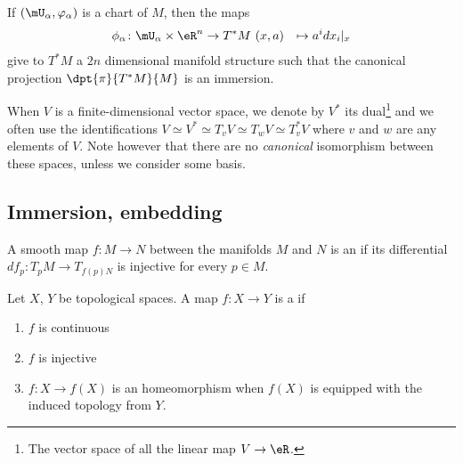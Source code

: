 If $(\mU_{\alpha},\varphi_{\alpha})$ is a chart of $M$, then the maps
		\begin{equation}
		\begin{aligned}
			\phi_{\alpha} \colon \mU_{\alpha}\times\eR^n &\to T^*M\
			(x,a)&\mapsto a^idx_i|_x
		\end{aligned}
	\end{equation}
give to $T^*M$ a $2n$ dimensional manifold structure such that the canonical projection $\dpt{\pi}{T^*M}{M}$ is an immersion.

When $V$ is a finite-dimensional vector space, we denote by $V^*$ its dual\footnote{The vector space of all the linear map $V\to \eR$.} and we often use the identifications $V\simeq V^*\simeq T_vV\simeq T_wV\simeq T^*_vV$ where $v$ and $w$ are any elements of $V$. Note however that there are no \emph{canonical} isomorphism between these spaces, unless we consider some basis.

\subsection{Immersion, embedding}

\begin{definition}[\cite{BIBooECJTooEfmLsr}]    \label{DEFooZEWNooMVOzWI}
    A smooth map \( f\colon M\to N\) between the manifolds \( M\) and \( N\) is an  if its differential \( df_p\colon T_pM\to T_{f(p)N}\) is injective for every \( p\in M\).
\end{definition}

\begin{definition}
    Let \( X\), \( Y\) be topological spaces. A map \( f\colon X\to Y\) is a  if
    \begin{enumerate}
        \item
            \( f\) is continuous
        \item
            \( f\) is injective
        \item
            \( f\colon X\to f(X)\) is an homeomorphism when \( f(X)\) is equipped with the induced topology from \( Y\).
    \end{enumerate}
\end{definition}

